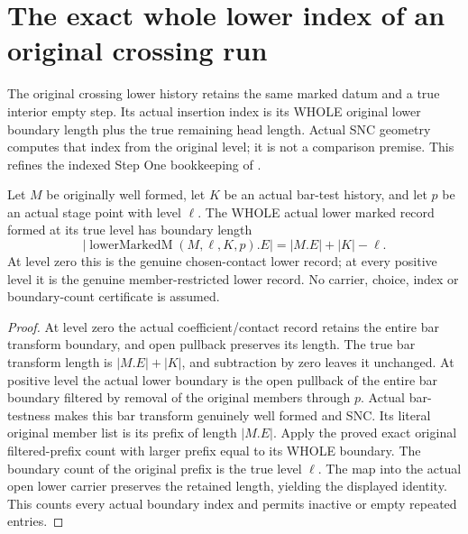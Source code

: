 \section{The exact whole lower index of an original crossing run}

The original crossing lower history retains the same marked datum and a true
interior empty step. Its actual insertion index is its WHOLE original lower
boundary length plus the true remaining head length. Actual SNC geometry
computes that index from the original level; it is not a comparison premise.
This refines the indexed Step One bookkeeping of
\cite{wlodarczyk05-hironaka,bierstone-milman08-functoriality}.

\begin{lemma}
\label{hir:original-whole-lower-boundary-exact-length}
\leanok
Let $M$ be originally well formed, let $K$ be an actual bar-test history, and
let $p$ be an actual stage point with level $\ell$. The WHOLE actual lower
marked record formed at its true level has boundary length
\[
 |\operatorname{lowerMarkedM}(M,\ell,K,p).E|
       =|M.E|+|K|-\ell.
\]
At level zero this is the genuine chosen-contact lower record; at every
positive level it is the genuine member-restricted lower record. No carrier,
choice, index or boundary-count certificate is assumed.
\end{lemma}
\begin{proof}
At level zero the actual coefficient/contact record retains the entire bar
transform boundary, and open pullback preserves its length. The true bar
transform length is $|M.E|+|K|$, and subtraction by zero leaves it unchanged.
At positive level the actual lower boundary is the open pullback of the
entire bar boundary filtered by removal of the original members through $p$.
Actual bar-testness makes this bar transform genuinely well formed and SNC.
Its literal original member list is its prefix of length $|M.E|$. Apply the
proved exact original filtered-prefix count with larger prefix equal to its
WHOLE boundary. The boundary count of the original prefix is the true level
$\ell$. The map into the actual open lower carrier preserves the retained
length, yielding the displayed identity. This counts every actual boundary
index and permits inactive or empty repeated entries.
\end{proof}

